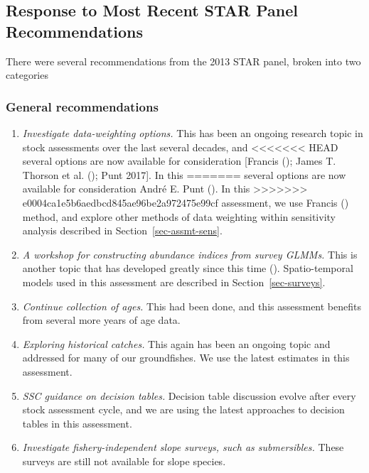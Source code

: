 \documentclass[
]{scrartcl}
\providecommand{\tightlist}{%
  \setlength{\itemsep}{0pt}\setlength{\parskip}{0pt}}\usepackage{longtable,booktabs,array}
\begin{document}
\subsection{Response to Most Recent STAR Panel
Recommendations}\label{response-to-most-recent-star-panel-recommendations}

There were several recommendations from the 2013 STAR panel, broken into
two categories

\subsubsection{General recommendations}\label{general-recommendations}

\begin{enumerate}
\def\labelenumi{\arabic{enumi}.}
\tightlist
\item
  \emph{Investigate data-weighting options.} This has been an ongoing
  research topic in stock assessments over the last several decades, and
<<<<<<< HEAD
  several options are now available for consideration {[}Francis
  (); James T. Thorson et al.
  (); Punt 2017{]}. In this
=======
  several options are now available for consideration André E. Punt
  (). In this
>>>>>>> e0004ca1e5b6aedbcd845ae96be2a972475e99cf
  assessment, we use Francis ()
  method, and explore other methods of data weighting within sensitivity
  analysis described in Section~\ref{sec-assmt-sens}.
\item
  \emph{A workshop for constructing abundance indices from survey
  GLMMs.} This is another topic that has developed greatly since this
  time (). Spatio-temporal models used in this assessment are described
  in Section~\ref{sec-surveys}.
\item
  \emph{Continue collection of ages.} This had been done, and this
  assessment benefits from several more years of age data.
\item
  \emph{Exploring historical catches.} This again has been an ongoing
  topic and addressed for many of our groundfishes. We use the latest
  estimates in this assessment.
\item
  \emph{SSC guidance on decision tables.} Decision table discussion
  evolve after every stock assessment cycle, and we are using the latest
  approaches to decision tables in this assessment.
\item
  \emph{Investigate fishery-independent slope surveys, such as
  submersibles.} These surveys are still not available for slope
  species.
\end{enumerate}
\end{document}
